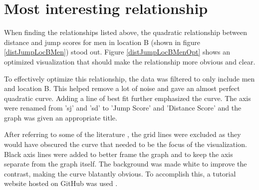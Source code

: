 \documentclass[runningheads]{llncs}
\begin{document}



\section{Most interesting relationship}
When finding the relationships listed above, the quadratic relationship between distance and jump scores for men in location B (shown in figure \ref{distJumpLocBMen}) stood out. Figure \ref{distJumpLocBMenOpt} shows an optimized visualization that should make the relationship more obvious and clear.

To effectively optimize this relationship, the data was filtered to only include men and location B. This helped remove a lot of noise and gave an almost perfect quadratic curve. Adding a line of best fit further emphasized the curve. The axis were renamed from 'sj' and 'sd' to 'Jump Score' and 'Distance Score' and the graph was given an appropriate title.

After referring to some of the literature \cite{effcomnum}, the grid lines were excluded as they would have obscured the curve that needed to be the focus of the visualization. Black axis lines were added to better frame the graph and to keep the axis separate from the graph itself. The background was made white to improve the contrast, making the curve blatantly obvious. To accomplish this, a tutorial website hosted on GitHub was used \cite{remGridBack}.
\end{document}
